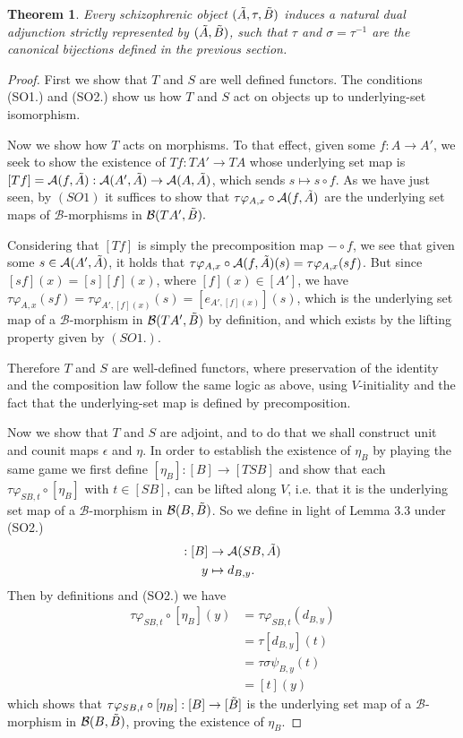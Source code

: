 \documentclass[12pt,a4paper]{article}
\newtheorem{theorem}{Theorem}[section] %
\def\HomA{\ensuremath\mathcal{A}}
\def\HomB{\ensuremath\mathcal{B}}
\def\t{\ensuremath\tilde}
\begin{document}
\begin{theorem}
	Every schizophrenic object $(\t A, \tau , \t B)$ induces a natural dual adjunction strictly represented by $(\t A, \t B)$, such that $\tau$ and $\sigma = \tau^{-1}$ are the canonical bijections defined in the previous section.
\end{theorem}
\begin{proof}
	First we show that $T$ and $S$ are well defined functors. The conditions (SO1.) and (SO2.) show us how $T$ and $S$ act on objects up to underlying-set isomorphism. 
	
	Now we show how $T$ acts on morphisms. To that effect, given some $f: A \to A'$, we seek to show the existence of $Tf: TA' \to TA$ whose underlying set map is $[Tf] = \HomA(f, \t A): \HomA(A', \t A) \to \HomA(A, \t A)$, which sends $s \mapsto s \circ f$. As we have just seen, by $(SO1)$ it suffices to show that $\tau \varphi_{A,x}\circ \HomA(f, \t A)$ are the underlying set maps of  $\mathcal{B}$-morphisms in $\HomB(TA', \t B).$
	
	Considering that $[Tf]$ is simply the precomposition map $- \circ f$, we see that given some $s \in \HomA(A', \t A)$, it holds that $\tau \varphi_{A,x}\circ \HomA(f, \t A)(s) =\tau \varphi_{A,x}(sf)$. But since $[sf](x) = [s][f](x)$, where $[f](x) \in [A']$, we have $\tau \varphi_{A,x}(sf) = \tau \varphi_{A',[f](x)}(s) = [e_{A',[f](x)}](s)$, which is the underlying set map of a $\mathcal{B}$-morphism in $\HomB(TA', \t B)$ by definition, and which exists by the lifting property given by $(SO1.)$. 
	
	Therefore $T$ and $S$ are well-defined functors, where preservation of the identity and the composition law follow the same logic as above, using $V$-initiality and the fact that the underlying-set map is defined by precomposition.
	
	Now we show that $T$ and $S$ are adjoint, and to do that we shall construct  unit and counit maps $\epsilon$ and $\eta$. In order to establish the existence of $\eta_B$ by playing the same game we first define $[\eta_B]: [B] \to [TSB]$ and show that each $\tau \varphi_{SB, t} \circ [\eta_B]$ with $t \in [SB]$, can be lifted along $V$, i.e. that it is the underlying set map of a $\mathcal{B}$-morphism in $\HomB(B, \t B)$. So we define in light of Lemma 3.3 under (SO2.)
	\begin{align*}
		[\eta_B]:[B] &\to \HomA(SB, \t A)\\
		y &\mapsto d_{B,y}.
	\end{align*}
Then by definitions and (SO2.) we have  \begin{align*}
	\tau \varphi_{SB, t} \circ [\eta_B](y) &= \tau \varphi_{SB, t} (d_{B,y})\\ &= \tau [d_{B,y}](t)\\ &= \tau \sigma \psi_{B,y}(t)\\ &= [t](y)
\end{align*}
which shows that $\tau \varphi_{SB, t} \circ [\eta_B]: [B] \to [\t B]$ is the underlying set map of a $\mathcal{B}$-morphism in $\HomB(B, \t B)$, proving the existence of $\eta_B$. 


\end{proof}
\end{document}
